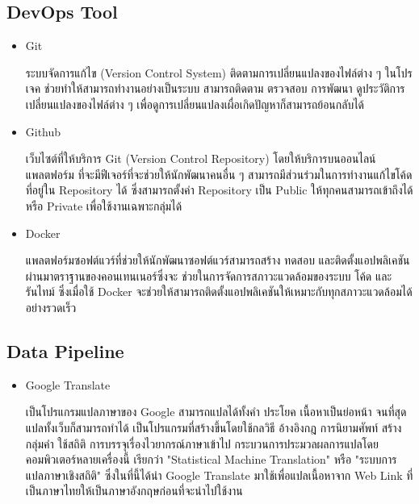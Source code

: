 \documentclass[12pt,oneside,openright,a4paper]{cpe-thai-project}
\begin{document}
  \subsection{DevOps Tool}
    \begin{itemize}
      \item Git
      
      \hspace{1cm}ระบบจัดการแก้ไข (Version Control System) ติดตามการเปลี่ยนแปลงของไฟล์ต่าง ๆ ในโปรเจค ช่วยทำให้สามารถทำงานอย่างเป็นระบบ 
      สามารถติดตาม ตรวจสอบ การพัฒนา ดูประวัติการเปลี่ยนแปลงของไฟล์ต่าง ๆ เพื่อดูการเปลี่ยนแปลงเผื่อเกิดปัญหาก็สามารถย้อนกลับได้ \cite{git}

      \item Github
      
      \hspace{1cm}เว็บไซต์ที่ให้บริการ Git (Version Control Repository) โดยให้บริการบนออนไลน์แพลตฟอร์ม 
      ที่จะมีฟีเจอร์ที่จะช่วยให้นักพัฒนาคนอื่น ๆ สามารถมีส่วนร่วมในการทำงานแก้ไขโค้ดที่อยู่ใน Repository ได้
      ซึ่งสามารถตั้งค่า Repository เป็น Public ให้ทุกคนสามารถเข้าถึงได้ หรือ Private เพื่อใช้งานเฉพาะกลุ่มได้ \cite{github}

      \item Docker
      
      \hspace{1cm}แพลตฟอร์มซอฟต์แวร์ที่ช่วยให้นักพัฒนาซอฟต์แวร์สามารถสร้าง ทดสอบ และติดตั้งแอปพลิเคชันผ่านมาตราฐานของคอนเทนเนอร์ซึ่งจะ
      ช่วยในการจัดการสภาวะแวดล้อมของระบบ โค้ด และรันไทม์ ซึ่งเมื่อใช้ Docker จะช่วยให้สามารถติดตั้งแอปพลิเคชันให้เหมาะกับทุกสภาวะแวดล้อมได้อย่างรวดเร็ว \cite{docker} 
    \end{itemize}
  \subsection{Data Pipeline}
    \begin{itemize}
      \item Google Translate
      
      \hspace{1cm}เป็นโปรแกรมแปลภาษาของ Google สามารถแปลได้ทั้งคำ ประโยค เนื้อหาเป็นย่อหน้า จนที่สุดแปลทั้งเว็บก็สามารถทำได้
      เป็นโปรแกรมที่สร้างขึ้นโดยใช้กลวิธี อ้างอิงกฎ การนิยามศัพท์ สร้างกลุ่มคำ ใช้สถิติ การบรรจุเรื่องไวยากรณ์ภาษาเข้าไป 
      กระบวนการประมวลผลการแปลโดยคอมพิวเตอร์หลายเครื่องนี้ เรียกว่า "Statistical Machine Translation" หรือ "ระบบการแปลภาษาเชิงสถิติ" \cite{gg_tran}
      ซึ่งในที่นี้ได้นำ Google Translate มาใช้เพื่อแปลเนื้อหาจาก Web Link ที่เป็นภาษาไทยให้เป็นภาษาอังกฤษก่อนที่จะนำไปใช้งาน
    \end{itemize}
\end{document}
